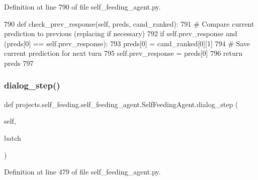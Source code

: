 Definition at line 790 of file self\+\_\+feeding\+\_\+agent.\+py.


\begin{DoxyCode}
790     \textcolor{keyword}{def }check\_prev\_response(self, preds, cand\_ranked):
791         \textcolor{comment}{# Compare current prediction to previous (replacing if necessary)}
792         \textcolor{keywordflow}{if} self.prev\_response \textcolor{keywordflow}{and} (preds[0] == self.prev\_response):
793             preds[0] = cand\_ranked[0][1]
794         \textcolor{comment}{# Save current prediction for next turn}
795         self.prev\_response = preds[0]
796         \textcolor{keywordflow}{return} preds
797 
\end{DoxyCode}
\mbox{\label{classprojects_1_1self__feeding_1_1self__feeding__agent_1_1SelfFeedingAgent_a29d503e95d996bbe351fe860631c3162}} 
\subsubsection{\texorpdfstring{dialog\+\_\+step()}{dialog\_step()}}
{\footnotesize\ttfamily def projects.\+self\+\_\+feeding.\+self\+\_\+feeding\+\_\+agent.\+Self\+Feeding\+Agent.\+dialog\+\_\+step (\begin{DoxyParamCaption}\item[{}]{self,  }\item[{}]{batch }\end{DoxyParamCaption})}



Definition at line 479 of file self\+\_\+feeding\+\_\+agent.\+py.


